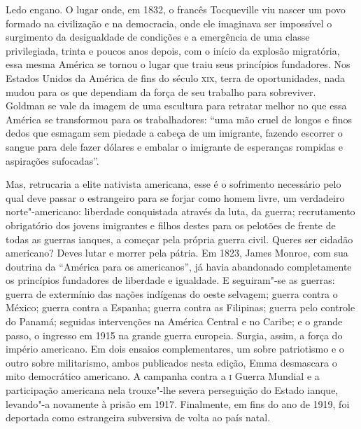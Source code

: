 Ledo engano. O lugar onde, em 1832, o francês Tocqueville viu nascer um 
povo formado na civilização e na democracia, onde ele imaginava ser
impossível o surgimento da desigualdade de condições e a emergência de
uma classe privilegiada, trinta e poucos anos depois, com o início da
explosão migratória, essa mesma América se tornou o lugar que traiu
seus princípios fundadores. Nos Estados Unidos da América de fins do
século \textsc{xix}, terra de oportunidades, nada mudou para os que dependiam da força
de seu trabalho para sobreviver. Goldman se vale da imagem de uma
escultura para retratar melhor no que essa América se transformou para
os trabalhadores: “uma mão cruel de longos e finos dedos que esmagam
sem piedade a cabeça de um imigrante, fazendo escorrer o sangue para
dele fazer dólares e embalar o imigrante de esperanças rompidas e
aspirações sufocadas”. 

Mas, retrucaria a elite nativista americana, esse é o sofrimento
necessário pelo qual deve passar o estrangeiro para se forjar como
homem livre, um verdadeiro norte"-americano: liberdade conquistada
através da luta, da guerra; recrutamento obrigatório dos jovens
imigrantes e filhos destes para os pelotões de frente de todas as
guerras ianques, a começar pela própria guerra civil. Queres ser
cidadão americano? Deves lutar e morrer pela pátria. Em 1823, James
Monroe, com sua doutrina da “América para os americanos”, já havia 
abandonado completamente os princípios fundadores de liberdade e
igualdade. E seguiram"-se as guerras: guerra de extermínio das nações
indígenas do oeste selvagem; guerra contra o México; guerra contra a Espanha; guerra contra
as Filipinas; guerra pelo controle do Panamá; seguidas intervenções na
América Central e no Caribe; e o grande passo, o ingresso em 1915 na
grande guerra europeia. Surgia, assim, a força do império americano. Em
dois ensaios complementares, um sobre patriotismo e o outro sobre
militarismo, ambos publicados nesta edição, Emma desmascara o mito
democrático americano. A campanha contra a \textsc{i} Guerra Mundial e a
participação americana nela trouxe"-lhe severa perseguição do Estado
ianque, levando"-a novamente à prisão em 1917.  Finalmente, em fins do
ano de 1919, foi deportada como estrangeira subversiva de volta ao país
natal.

